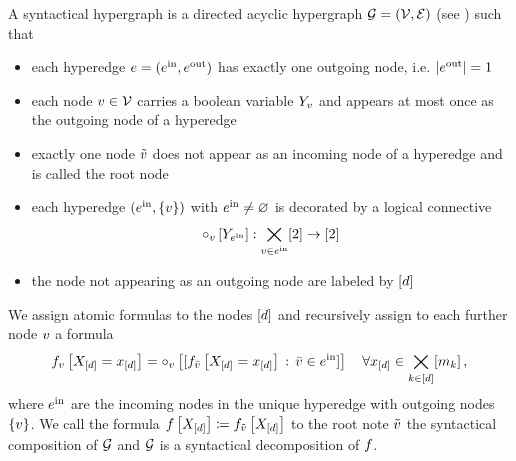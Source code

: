 \begin{definition}
    \label{def:formulaDecomposition}
    A syntactical hypergraph is a directed acyclic hypergraph $\mathcal{G}=(\mathcal{V},\mathcal{E})$ (see ) such that
    \begin{itemize}
        \item each hyperedge $e=(e^{\mathrm{in}},e^{\mathrm{out}})$ has exactly one outgoing node, i.e. $\left|e^{\mathrm{out}}\right|=1$
        \item each node $v\in\mathcal{V}$ carries a boolean variable $Y_{v}$ and appears at most once as the outgoing node of a hyperedge %
        \item exactly one node $\tilde{v}$ does not appear as an incoming node of a hyperedge and is called the root node %
        \item each hyperedge $(e^{\mathrm{in}},\{v\})$ with $e^{\mathrm{in}}\neq\varnothing$ is decorated by a logical connective
        \begin{align*}
            \circ_{v}\left[Y_{e^{\mathrm{in}}}\right] : \bigtimes_{v\in e^{\mathrm{in}}} [2] \rightarrow [2]
        \end{align*}
        \item the node not appearing as an outgoing node are labeled by $[d]$
    \end{itemize}
    We assign atomic formulas to the nodes $[d]$ and recursively assign to each further node $v$ a formula %
    \begin{align*}
        f_{v}\left[X_{[d]}=x_{[d]}\right]
        = \circ_{v}\left[[f_{\bar{v}}\left[X_{[d]}=x_{[d]}\right]\,:\,\bar{v}\in e^{\mathrm{in}}]\right] \quad \forall x_{[d]}\in\bigtimes_{k\in[d]}[m_{k}]\, ,
    \end{align*}
    where $e^{\mathrm{in}}$ are the incoming nodes in the unique hyperedge with outgoing nodes $\{v\}$.
    We call the formula $f\left[X_{[d]}\right]\coloneqq f_{\tilde{v}}\left[X_{[d]}\right]$ to the root note $\tilde{v}$ the syntactical composition of $\mathcal{G}$ and $\mathcal{G}$ is a syntactical decomposition of $f$.
\end{definition}

